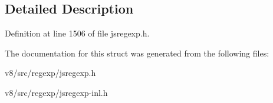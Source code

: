 \subsection{Detailed Description}


Definition at line 1506 of file jsregexp.\+h.



The documentation for this struct was generated from the following files\+:\begin{DoxyCompactItemize}
\item 
v8/src/regexp/jsregexp.\+h\item 
v8/src/regexp/jsregexp-\/inl.\+h\end{DoxyCompactItemize}
